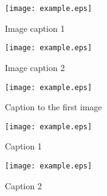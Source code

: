 \begin{figure}[ht]
    \centering
    \begin{minipage}[b]{0.45\textwidth} \centering
        \small{%
        \texttt{[image: example.eps]}%
        \vspace{0.15cm}}
        \small\caption{Image caption 1}
        \label{fig:fig1}
    \end{minipage}
        \begin{minipage}[b]{0.45\textwidth} \centering
        \small{%
        \texttt{[image: example.eps]}}
        \small\caption{Image caption 2}
        \label{fig:fig2}
	\end{minipage}
	\vspace*{-10pt}
\end{figure}%
\vspace{10pt}

\begin{figure}[ht]
    \begin{minipage}[b]{1.05\textwidth} \centering
    \hspace*{-40pt}
	\vspace*{-0.3cm} \centering
        \begin{minipage}[b]{0.69\textwidth} \centering
            \hspace*{-20pt}
            \small{%
            \texttt{[image: example.eps]}}
            \small\caption{Caption to the first image}
            \label{fig:fig3} 
        \end{minipage}
        \hspace*{-20pt}
        \begin{minipage}[b]{0.29\textwidth} \centering
            \hspace*{-20pt}
            \small{%
            \texttt{[image: example.eps]}}
            \small\caption{Caption 1}
            \label{fig:fig4}
            \vspace{8pt}
            \hspace*{-20pt}
            \small{%
            \texttt{[image: example.eps]}}
            \small\caption{Caption 2}
            \label{fig:fig5} 
        \end{minipage}
    \end{minipage}
    \vspace{5pt}
\end{figure}%
\vspace{10pt}


